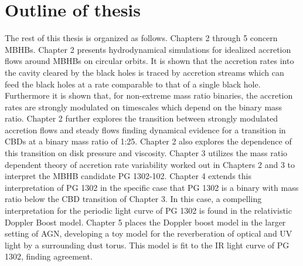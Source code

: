 

















\section{Outline of thesis}  
The rest of this thesis is organized as follows.
Chapters 2 through 5 concern MBHBs. Chapter 2 presents hydrodynamical
simulations for idealized accretion flows around MBHBs on circular orbits. It
is shown that the accretion rates into the cavity cleared by the black holes
is traced by accretion streams which can feed the black holes at a rate
comparable to that of a single black hole. Furthermore it is shown that, for
non-extreme mass ratio binaries, the accretion rates are strongly modulated on
timescales which depend on the binary mass ratio. Chapter 2 further explores
the transition between strongly modulated accretion flows and steady flows
finding dynamical evidence for a transition in CBDs at a binary mass ratio of
1:25. Chapter 2 also explores the dependence of this transition on disk
pressure and viscosity. Chapter 3 utilizes the mass ratio dependent theory of
accretion rate variability worked out in Chapters 2 and 3 to interpret the
MBHB candidate PG 1302-102. Chapter 4 extends this interpretation of PG 1302
in the specific case that PG 1302 is a binary with mass ratio below the CBD
transition of Chapter 3. In this case, a compelling interpretation for the
periodic light curve of PG 1302 is found in the relativistic Doppler Boost
model. Chapter 5 places the Doppler boost model in the larger setting of AGN,
developing a toy model for the reverberation of optical and UV light by a
surrounding dust torus. This model is fit to the IR light curve of PG 1302,
finding agreement.


